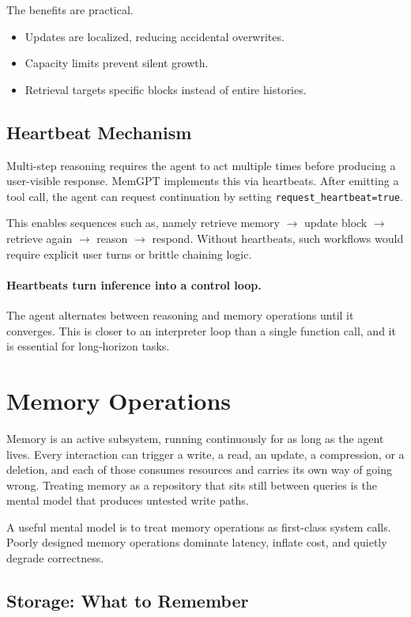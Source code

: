 The benefits are practical.
\begin{itemize}
\item Updates are localized, reducing accidental overwrites.
\item Capacity limits prevent silent growth.
\item Retrieval targets specific blocks instead of entire histories.
\end{itemize}

\subsection{Heartbeat Mechanism}

Multi-step reasoning requires the agent to act multiple times before producing a user-visible response. MemGPT implements this via heartbeats. After emitting a tool call, the agent can request continuation by setting \texttt{request\_heartbeat=true}.

This enables sequences such as, namely retrieve memory $\rightarrow$ update block $\rightarrow$ retrieve again $\rightarrow$ reason $\rightarrow$ respond. Without heartbeats, such workflows would require explicit user turns or brittle chaining logic.

\paragraph{Heartbeats turn inference into a control loop.}
The agent alternates between reasoning and memory operations until it converges. This is closer to an interpreter loop than a single function call, and it is essential for long-horizon tasks.
\section{Memory Operations}

Memory is an active subsystem, running continuously for as long as the agent
lives. Every interaction can trigger a write, a read, an update, a compression, or
a deletion, and each of those consumes resources and carries its own way of going
wrong. Treating memory as a repository that sits still between queries is the
mental model that produces untested write paths.

A useful mental model is to treat memory operations as first-class system calls. Poorly designed memory operations dominate latency, inflate cost, and quietly degrade correctness.

\subsection{Storage: What to Remember}

